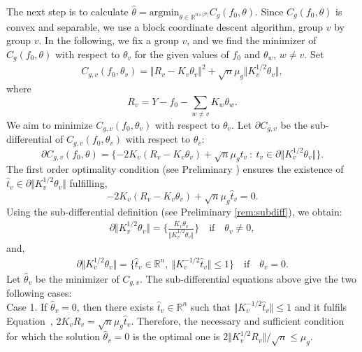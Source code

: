 The next step is to calculate $\widehat{\theta}=\text{argmin}_{\theta\in\mathbb{R}^{n\times\vert \mathcal{P}\vert}}C_g(f_0,\theta).$ 
Since $C_g(f_0,\theta)$ is convex and separable, we use a block coordinate descent algorithm, group $v$ by group $v$. In the following, we fix a group $v$, and we find the minimizer of $C_g(f_0,\theta)$ with respect to $\theta_v$ for the given values of $f_0$ and $\theta_w$, $w\neq v$. Set
\begin{align*}
C_{g,v}(f_0,\theta_v)=\Vert R_v-K_v\theta_v\Vert^2+\sqrt{n}\mu_g\Vert K_v^{1/2}\theta_v\Vert,
\end{align*}
where 
\begin{equation}
\label{residul}
R_v = Y-f_0-\sum_{w\neq v}K_w\theta_w.
\end{equation}
We aim to minimize $C_{g,v}(f_0,\theta_v)$ with respect to $\theta_v$. Let $\partial C_{g,v}$ be the sub-differential of $C_{g,v}(f_0,\theta_v)$ with respect to $\theta_v$:
\begin{equation*}
\partial C_{g,v}(f_0,\theta)=\{-2K_v(R_v-K_v\theta_v)+\sqrt{n}\mu_gt_v\: :\: t_v\in\partial\Vert K_v^{1/2}\theta_v\Vert\}.
\end{equation*}
The first order optimality condition (see Preliminary ) ensures the existence of $\widehat{t}_v\in\partial\Vert K_v^{1/2}\theta_v\Vert$ fulfilling, 
\begin{equation}
\label{fop}
-2K_v(R_v-K_v\theta_v)+\sqrt{n}\mu_g\widehat{t}_v=0.
\end{equation}
Using the sub-differential definition (see Preliminary \ref{rem:subdiff}), we obtain: 
\begin{align*}
\partial\Vert K_v^{1/2}\theta_v\Vert= \{\frac{K_v\theta_v}{\Vert K_v^{1/2}\theta_v\Vert}\}\quad \text{if}\quad \theta_v\neq 0,
\end{align*}
and,
\begin{align*}
 \partial\Vert K_v^{1/2}\theta_v\Vert=\{\widehat{t}_v\in\mathbb{R}^n,\:\Vert K_v^{-1/2}\widehat{t}_v\Vert\leq 1\}\quad\text{if}\quad \theta_v=0.
\end{align*}
Let $\widehat{\theta}_v$ be the minimizer of $C_{g,v}$. The sub-differential equations above give the two following cases:\\ 
Case 1. If $\widehat{\theta}_v=0$, then there exists $\widehat{t}_v\in\mathbb{R}^n$ such that $\Vert K_v^{-1/2}\widehat{t}_v\Vert\leq 1$ and it fulfils Equation~, $2K_vR_v=\sqrt{n}\mu_g\widehat{t}_v$. 
Therefore, the necessary and sufficient condition for which the solution $\widehat{\theta}_v = 0$ is the optimal one is $2\Vert K_v^{1/2}R_v\Vert/\sqrt{n}\leq\mu_g.$\\
